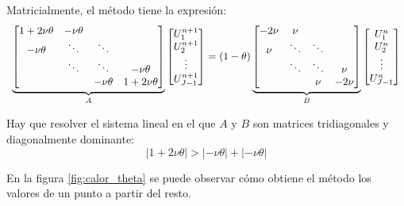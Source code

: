 Matricialmente, el método tiene la expresión:
\begin{equation*}
	\begin{array}{l l l}
		\underbrace{
		\begin{bmatrix}
			1+2\nu\theta & -\nu\theta &        & \\
			-\nu\theta   & \ddots     & \ddots & \\
			& \ddots     & \ddots     & -\nu\theta\\
			&            & -\nu\theta & 1+2\nu\theta\\
		\end{bmatrix}}_A
		\begin{bmatrix}
			U_1^{n+1}\\
			U_2^{n+1}\\
			\vdots\\
			U_{J-1}^{n+1}\\
		\end{bmatrix}
		=
		(1-\theta)
		\underbrace{
		\begin{bmatrix}
			-2\nu         & \nu&        & \\
			\nu            & \ddots       & \ddots & \\
			& \ddots & \ddots        & \nu\\
			&        & \nu & -2\nu\\
		\end{bmatrix}}_B
			\begin{bmatrix}
				U_1^{n}\\
				U_2^{n}\\
				\vdots\\
				U_{J-1}^{n}\\
			\end{bmatrix}
	\end{array}
	\end{equation*}
	
	Hay que resolver el sistema lineal en el que $A$ y $B$ son matrices tridiagonales y diagonalmente dominante:
	$$|1+2\nu\theta| > |-\nu\theta| + |-\nu\theta|$$
	
	En la figura \ref{fig:calor_theta} se puede observar cómo obtiene el método los valores de un punto a partir del resto.
	
